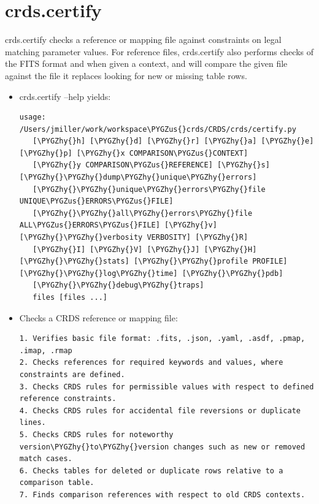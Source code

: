 \documentclass[letterpaper,10pt,english]{sphinxmanual}
\def\PYGZus{\char`\_}
\def\PYGZhy{\char`\-}
\begin{document}
\section{crds.certify}
\label{command_line_tools:crds-certify}
crds.certify checks a reference or mapping file against constraints on legal
matching parameter values.   For reference files,  crds.certify also performs checks
of the FITS format and when given a context,  and will compare the given file against
the file it replaces looking for new or missing table rows.
\begin{itemize}
\item {} 
crds.certify --help yields:

\begin{Verbatim}[commandchars=\\\{\}]
usage: /Users/jmiller/work/workspace\PYGZus{}crds/CRDS/crds/certify.py
   [\PYGZhy{}h] [\PYGZhy{}d] [\PYGZhy{}r] [\PYGZhy{}a] [\PYGZhy{}e] [\PYGZhy{}p] [\PYGZhy{}x COMPARISON\PYGZus{}CONTEXT]
   [\PYGZhy{}y COMPARISON\PYGZus{}REFERENCE] [\PYGZhy{}s] [\PYGZhy{}\PYGZhy{}dump\PYGZhy{}unique\PYGZhy{}errors]
   [\PYGZhy{}\PYGZhy{}unique\PYGZhy{}errors\PYGZhy{}file UNIQUE\PYGZus{}ERRORS\PYGZus{}FILE]
   [\PYGZhy{}\PYGZhy{}all\PYGZhy{}errors\PYGZhy{}file ALL\PYGZus{}ERRORS\PYGZus{}FILE] [\PYGZhy{}v] [\PYGZhy{}\PYGZhy{}verbosity VERBOSITY] [\PYGZhy{}R]
   [\PYGZhy{}I] [\PYGZhy{}V] [\PYGZhy{}J] [\PYGZhy{}H] [\PYGZhy{}\PYGZhy{}stats] [\PYGZhy{}\PYGZhy{}profile PROFILE] [\PYGZhy{}\PYGZhy{}log\PYGZhy{}time] [\PYGZhy{}\PYGZhy{}pdb]
   [\PYGZhy{}\PYGZhy{}debug\PYGZhy{}traps]
   files [files ...]
\end{Verbatim}

\item {} 
Checks a CRDS reference or mapping file:

\begin{Verbatim}[commandchars=\\\{\}]
1. Verifies basic file format: .fits, .json, .yaml, .asdf, .pmap, .imap, .rmap
2. Checks references for required keywords and values, where constraints are defined.
3. Checks CRDS rules for permissible values with respect to defined reference constraints.
4. Checks CRDS rules for accidental file reversions or duplicate lines.
5. Checks CRDS rules for noteworthy version\PYGZhy{}to\PYGZhy{}version changes such as new or removed match cases.
6. Checks tables for deleted or duplicate rows relative to a comparison table.
7. Finds comparison references with respect to old CRDS contexts.
\end{Verbatim}


\end{itemize}
\end{document}
